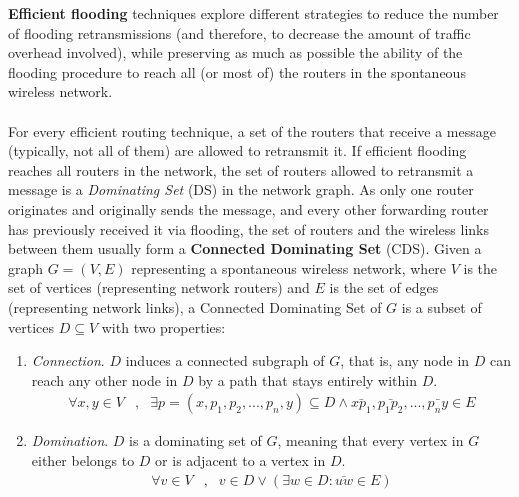 {\bf Efficient flooding} techniques explore different strategies to reduce the number of flooding retransmissions (and therefore, to decrease the amount of traffic overhead involved), while preserving as much as possible the ability of the flooding procedure to reach all (or most of) the routers in the spontaneous wireless network. \ \\ \ \\
%
For every efficient routing technique, a set of the routers that receive a message (typically, not all of them) are allowed to retransmit it. If efficient flooding reaches all routers in the network, the set of routers allowed to retransmit a message is a {\em Dominating Set} (DS) in the network graph. As only one router originates and originally sends the message, and every other forwarding router has previously received it via flooding, the set of routers and the wireless links between them usually form a {\bf Connected Dominating Set} (CDS). Given a graph $G=(V,E)$ representing a spontaneous wireless network, where $V$ is the set of vertices (representing network routers) and $E$ is the set of edges (representing network links), a Connected Dominating Set of $G$ is a subset of vertices $D \subseteq V$ with two properties:


\begin{enumerate}
\item {\em Connection}. $D$ induces a connected subgraph of $G$, that is, any node in $D$ can reach any other node in $D$ by a path that stays entirely within $D$. 
	\begin{align*}
	\forall x, y \in V &,& \exists p=(x, p_1, p_2, ..., p_n, y) \subseteq D \wedge \bar{xp_1}, \bar{p_1p_2}, ..., \bar{p_ny} \in E
	\end{align*}
\item {\em Domination}. $D$ is a dominating set of $G$, meaning that every vertex in $G$ either belongs to $D$ or is adjacent to a vertex in $D$.
	\begin{align*} 
	\forall v \in V &,& v \in D \vee ( \exists w \in D : \bar{uw} \in E )
	\end{align*}
\end{enumerate} 


